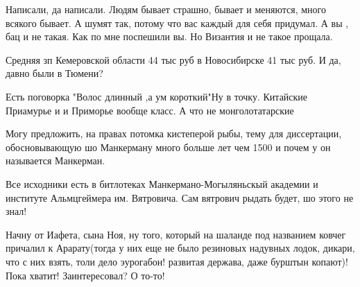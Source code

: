 \begin{itemize}
 

Написали, да написали. Людям бывает страшно, бывает и меняются, много всякого
бывает. А шумят так, потому что вас каждый для себя придумал. А вы , бац и не
такая. Как по мне поспешили вы. Но Византия и не такое прощала.

 
Средняя зп Кемеровской области 44 тыс руб в Новосибирске 41 тыс руб. И да, давно были в Тюмени?

 
Есть поговорка "Волос длинный ,а ум короткий"Ну в точку. Китайские Приамурье и
и Приморье вообще класс. А что не монголотатарские🤣🤣🤣

 

Могу предложить, на правах потомка кистеперой рыбы, тему для диссертации,
обосновывающую шо Манкерману много больше лет чем 1500 и почем у он называется
Манкерман. 

Все исходники есть в битлотеках Манкермано-Могыляньскый академии и институте
Альмцгеймера им. Вятровича. Сам вятрович рыдать будет, шо этого не знал! 

Начну от Иафета, сына Ноя, ну того, который на шаланде под названием ковчег
причалил к Арарату(тогда у них еще не было резиновых надувных лодок, дикари,
что с них взять, толи дело эурогабон! развитая держава, даже бурштын копают)!
Пока хватит! Заинтересовал? О то-то!


 


\end{itemize}
